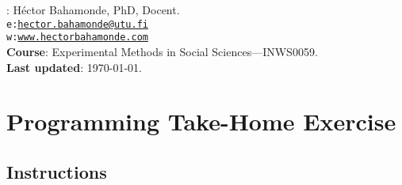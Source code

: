 \documentclass[10pt]{article}
\begin{document}


\thispagestyle{fancy} %





\hspace{-5mm}{\bf Instructor}: H\'ector Bahamonde, PhD, Docent.\\
\texttt{e:}\href{mailto:hector.bahamonde@utu.fi}{\texttt{hector.bahamonde@utu.fi}}\\
\texttt{w:}\href{http://www.hectorbahamonde.com}{\texttt{www.hectorbahamonde.com}}\\
{\bf Course}: Experimental Methods in Social Sciences---INWS0059.\\
{\bf Last updated}: \today.


\section*{Programming Take-Home Exercise}

\subsection*{Instructions}
\end{document}
